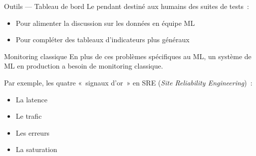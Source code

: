 \begin{frame}{Outils — Tableau de bord}
  Le pendant destiné aux humains des suites de tests~:

  \begin{itemize}
    \item Pour alimenter la discussion sur les données en équipe ML
    \item Pour compléter des tableaux d'indicateurs plus généraux
  \end{itemize}
\end{frame}

\begin{frame}{Monitoring classique}
  En plus de ces problèmes spécifiques au ML, un système de ML en production a besoin de monitoring classique.

  Par exemple, les quatre «~signaux d'or~» en SRE (\textit{Site Reliability Engineering})~:

  \begin{itemize}
    \item La latence
    \item Le trafic
    \item Les erreurs
    \item La saturation
  \end{itemize}
\end{frame}
